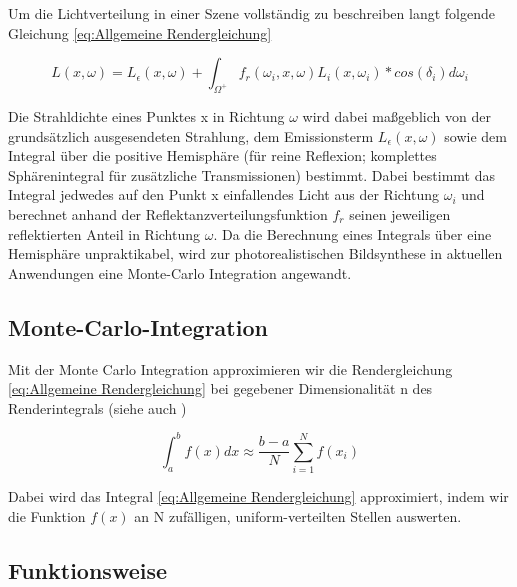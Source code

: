 Um die Lichtverteilung in einer Szene vollständig zu beschreiben langt folgende Gleichung \ref{eq:Allgemeine Rendergleichung} \cite{kajiya1986rendering}

\begin{tcolorbox}[rightrule=3mm, rounded corners=east]
    \begin{equation}\label{eq:Allgemeine Rendergleichung}
        L(x,\omega) = L_{\epsilon}(x,\omega) + \int_{\Omega^{+}}f_{r}(\omega_{i},x,\omega)L_{i}(x,\omega_{i})*cos(\delta_{i})d\omega_{i}
    \end{equation}
\end{tcolorbox}

Die Strahldichte eines Punktes x in Richtung $\omega$ wird dabei maßgeblich von der grundsätzlich ausgesendeten Strahlung, dem Emissionsterm 
$L_{\epsilon}(x,\omega)$ sowie dem Integral über die positive Hemisphäre (für reine Reflexion; komplettes Sphärenintegral für zusätzliche 
Transmissionen) bestimmt. Dabei bestimmt das Integral jedwedes auf den Punkt x einfallendes Licht aus der Richtung $\omega_{i}$ und berechnet 
anhand der Reflektanzverteilungsfunktion $f_{r}$ seinen jeweiligen reflektierten Anteil in Richtung $\omega$. Da die Berechnung eines Integrals
über eine Hemisphäre unpraktikabel, wird zur photorealistischen Bildsynthese in aktuellen Anwendungen \cite{PathTracingInProduction} eine 
Monte-Carlo Integration angewandt.

\subsection{Monte-Carlo-Integration}
Mit der Monte Carlo Integration approximieren wir die Rendergleichung \ref{eq:Allgemeine Rendergleichung} bei gegebener Dimensionalität n des Renderintegrals 
(siehe auch \cite{KK02})

\begin{tcolorbox}[rightrule=3mm, rounded corners=east]
    \begin{equation}\label{eq:Monte-Carlo}
        \int_{a}^{b}f(x)dx \approx \frac{b-a}{N}\sum_{i=1}^{N}f(x_{i})
    \end{equation}
\end{tcolorbox}

Dabei wird das Integral \ref{eq:Allgemeine Rendergleichung} approximiert, indem wir die Funktion $f(x)$ an N zufälligen, uniform-verteilten
Stellen auswerten. 
\newpage 

\subsection{Funktionsweise}

